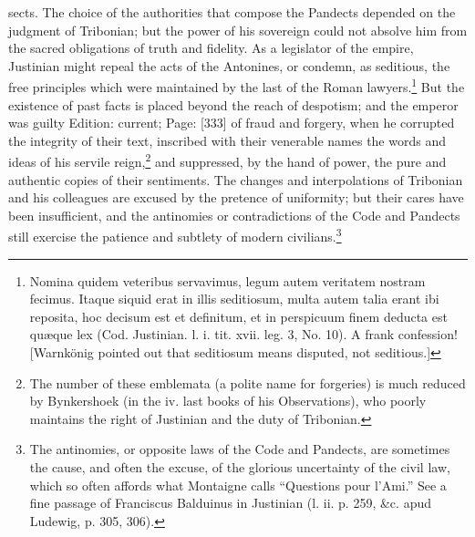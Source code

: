 sects. The choice of the authorities that compose the Pandects depended on the judgment of Tribonian; but the power of his sovereign could not absolve him from the sacred obligations of truth and fidelity. As a legislator of the empire, Justinian might repeal the acts of the Antonines, or condemn, as seditious, the free principles which were maintained by the last of the Roman lawyers.\footnote{Nomina quidem veteribus servavimus, legum autem veritatem nostram fecimus. Itaque siquid erat in illis seditiosum, multa autem talia erant ibi reposita, hoc decisum est et definitum, et in perspicuum finem deducta est quæque lex (Cod. Justinian. l. i. tit. xvii. leg. 3, No. 10). A frank confession! [Warnkönig pointed out that seditiosum means disputed, not seditious.]} But the existence of past facts is placed beyond the reach of despotism; and the emperor was guilty Edition: current; Page: [333] of fraud and forgery, when he corrupted the integrity of their text, inscribed with their venerable names the words and ideas of his servile reign,\footnote{The number of these emblemata (a polite name for forgeries) is much reduced by Bynkershoek (in the iv. last books of his Observations), who poorly maintains the right of Justinian and the duty of Tribonian.} and suppressed, by the hand of power, the pure and authentic copies of their sentiments. The changes and interpolations of Tribonian and his colleagues are excused by the pretence of uniformity; but their cares have been insufficient, and the antinomies or contradictions of the Code and Pandects still exercise the patience and subtlety of modern civilians.\footnote{The antinomies, or opposite laws of the Code and Pandects, are sometimes the cause, and often the excuse, of the glorious uncertainty of the civil law, which so often affords what Montaigne calls \texthebrew{“}Questions pour l\texthebrew{}’Ami.\texthebrew{}” See a fine passage of Franciscus Balduinus in Justinian (l. ii. p. 259, \&c. apud Ludewig, p. 305, 306).}

